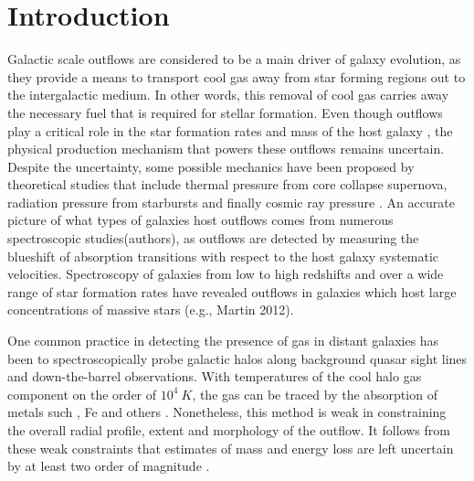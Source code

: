 \documentclass[twocolumn]{aastex6}
\begin{document}
\section{Introduction}
Galactic scale outflows are considered to be a main driver of galaxy evolution, as they provide a means to transport cool gas away from star forming regions out to the intergalactic medium. 
%
%
In other words, this removal of cool gas carries away the necessary fuel that is required for stellar formation. 
%
%
Even though outflows play a critical role in the star formation rates and mass of the host galaxy \citep{Werk_2014}, the physical production mechanism that powers these outflows remains uncertain.
%
%
Despite the uncertainty, some possible mechanics have been proposed by theoretical studies that include thermal pressure from core collapse supernova, radiation pressure from starbursts and finally cosmic ray pressure \citep{Sugahara_2017,Larson_1974,Chevalier_1985,Springel_2003}. 
%
%
An accurate picture of what types of galaxies host outflows comes from numerous spectroscopic studies(authors), as outflows are detected by measuring the blueshift of absorption transitions with respect to the host galaxy systematic velocities.
%
%
Spectroscopy of galaxies from low to high redshifts and over a wide range of star formation rates have revealed outflows in galaxies which host large concentrations of massive stars (e.g., \cite{Rubin_2014} Martin 2012). 
%

One common practice in detecting the presence of gas in distant galaxies has been to spectroscopically probe galactic halos along background quasar sight lines and down-the-barrel observations.
%
With temperatures of the cool halo gas component on the order of $10^4\ K$, the gas can be traced by the absorption of metals such , Fe and others \citep{Bordoloi_2011, Bergeron_1986}. 
%
Nonetheless, this method is weak in constraining the overall radial profile, extent and morphology of the outflow. 
%
It follows from these weak constraints that estimates of mass and energy loss are left uncertain by at least two order of magnitude \citep{Rubin_2014}. 
\end{document}
